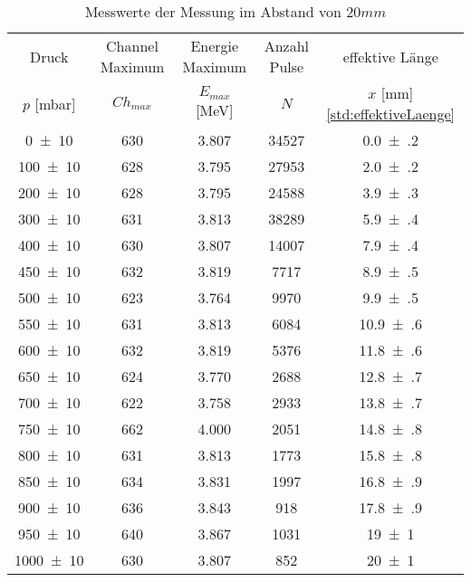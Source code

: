 \begin{table}[!h]
	\centering
	\begin{tabular}{|c|c|c|c|c|}
		\hline
		Druck & Channel Maximum & Energie Maximum & Anzahl Pulse& effektive Länge\\
		$p$ [\si{\milli\bar}] & $Ch_{max}$ & $E_{max}$ [\si{\mega\eV}] & $N$ & $x$ [\si{\milli\meter}] \cref{std:effektiveLaenge} \\
\hline\hline
		\num{0(10)} & \num{630} & \num{3.807} & \num{34527}& \num{0.0(2)}\\
		\num{100(10)} & \num{628} & \num{3.795} & \num{27953}& \num{2.0(2)}\\
		\num{200(10)} & \num{628} & \num{3.795} & \num{24588}& \num{3.9(3)}\\
		\rowcolor{lightgray}
		\num{300(10)} & \num{631} & \num{3.813} & \num{38289}& \num{5.9(4)}\\
		\num{400(10)} & \num{630} & \num{3.807} & \num{14007}& \num{7.9(4)}\\
		\num{450(10)} & \num{632} & \num{3.819} & \num{7717}& \num{8.9(5)}\\
		\num{500(10)} & \num{623} & \num{3.764} & \num{9970}& \num{9.9(5)}\\
		\num{550(10)} & \num{631} & \num{3.813} & \num{6084}& \num{10.9(6)}\\
		\num{600(10)} & \num{632} & \num{3.819} & \num{5376}& \num{11.8(6)}\\
		\num{650(10)} & \num{624} & \num{3.770} & \num{2688}& \num{12.8(7)}\\
		\num{700(10)} & \num{622} & \num{3.758} & \num{2933}& \num{13.8(7)}\\
		\num{750(10)} & \num{662} & \num{4.000} & \num{2051}& \num{14.8(8)}\\
		\num{800(10)} & \num{631} & \num{3.813} & \num{1773}& \num{15.8(8)}\\
		\num{850(10)} & \num{634} & \num{3.831} & \num{1997}& \num{16.8(9)}\\
		\num{900(10)} & \num{636} & \num{3.843} & \num{918}& \num{17.8(9)}\\
		\num{950(10)} & \num{640} & \num{3.867} & \num{1031}& \num{19(1)}\\
		\num{1000(10)} & \num{630} & \num{3.807} & \num{852}& \num{20(1)}\\
		\hline
	\end{tabular}
	\caption{Messwerte der Messung im Abstand von $20 \si{mm}$ \label{tab:Messwerte_I}}
\end{table}
